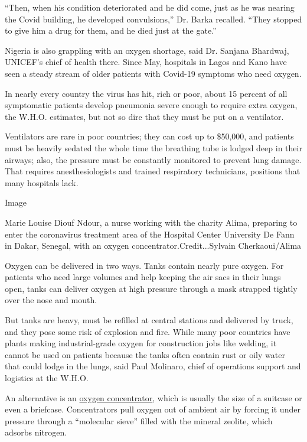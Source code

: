 ``Then, when his condition deteriorated and he did come, just as he was
nearing the Covid building, he developed convulsions,'' Dr. Barka
recalled. ``They stopped to give him a drug for them, and he died just
at the gate.''

Nigeria is also grappling with an oxygen shortage, said Dr. Sanjana
Bhardwaj, UNICEF's chief of health there. Since May, hospitals in Lagos
and Kano have seen a steady stream of older patients with Covid-19
symptoms who need oxygen.

In nearly every country the virus has hit, rich or poor, about 15
percent of all symptomatic patients develop pneumonia severe enough to
require extra oxygen, the W.H.O. estimates, but not so dire that they
must be put on a ventilator.

Ventilators are rare in poor countries; they can cost up to \$50,000,
and patients must be heavily sedated the whole time the breathing tube
is lodged deep in their airways; also, the pressure must be constantly
monitored to prevent lung damage. That requires anesthesiologists and
trained respiratory technicians, positions that many hospitals lack.

Image

Marie Louise Diouf Ndour, a nurse working with the charity Alima,
preparing to enter the coronavirus treatment area of the Hospital Center
University De Fann in Dakar, Senegal, with an oxygen
concentrator.Credit...Sylvain Cherkaoui/Alima

Oxygen can be delivered in two ways. Tanks contain nearly pure oxygen.
For patients who need large volumes and help keeping the air sacs in
their lungs open, tanks can deliver oxygen at high pressure through a
mask strapped tightly over the nose and mouth.

But tanks are heavy, must be refilled at central stations and delivered
by truck, and they pose some risk of explosion and fire. While many poor
countries have plants making industrial-grade oxygen for construction
jobs like welding, it cannot be used on patients because the tanks often
contain rust or oily water that could lodge in the lungs, said Paul
Molinaro, chief of operations support and logistics at the W.H.O.

An alternative is an
\href{https://en.wikipedia.org/wiki/Oxygen_concentrator}{oxygen
concentrator}, which is usually the size of a suitcase or even a
briefcase. Concentrators pull oxygen out of ambient air by forcing it
under pressure through a ``molecular sieve'' filled with the mineral
zeolite, which adsorbs nitrogen.


